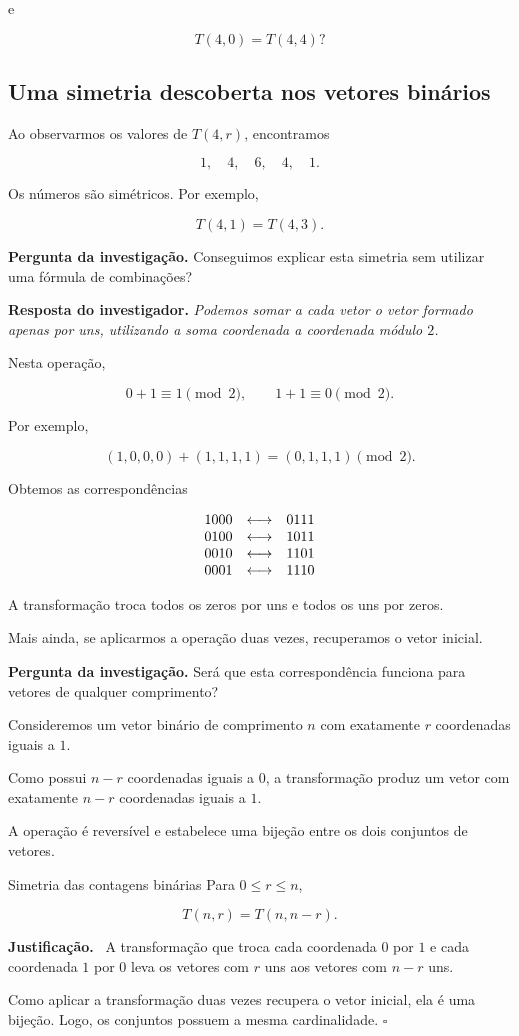 \documentclass[11pt,a4paper,oneside]{book}
\newcommand{\Pergunta}[1]{\begin{perguntabox}\textbf{Pergunta da investigação.} #1\end{perguntabox}}
\newcommand{\Resposta}[1]{\textcolor{verdeescuro}{\textbf{Resposta do investigador.}} \emph{#1}\par}
\newcommand{\prova}{\textbf{Justificação.}\ }
\newcommand{\fimprova}{\hfill$\square$}
\begin{document}
e

\[
T(4,0)=T(4,4)?
\]


\subsection*{Uma simetria descoberta nos vetores binários}

Ao observarmos os valores de $T(4,r)$, encontramos

\[
1,\quad 4,\quad 6,\quad 4,\quad 1.
\]

Os números são simétricos. Por exemplo,

\[
T(4,1)=T(4,3).
\]

\Pergunta{Conseguimos explicar esta simetria
sem utilizar uma fórmula de combinações?}

\Resposta{Podemos somar a cada vetor o vetor
formado apenas por uns, utilizando a soma
coordenada a coordenada módulo $2$.}

Nesta operação,

\[
0+1\equiv1\pmod2,\qquad
1+1\equiv0\pmod2.
\]

Por exemplo,

\[
(1,0,0,0)+(1,1,1,1)
=(0,1,1,1)\pmod2.
\]

Obtemos as correspondências

\[
\begin{array}{c@{\quad\longleftrightarrow\quad}c}
1000 & 0111\\
0100 & 1011\\
0010 & 1101\\
0001 & 1110
\end{array}
\]

A transformação troca todos os zeros por uns
e todos os uns por zeros.

Mais ainda, se aplicarmos a operação duas vezes,
recuperamos o vetor inicial.

\Pergunta{Será que esta correspondência funciona
para vetores de qualquer comprimento?}

Consideremos um vetor binário de comprimento $n$
com exatamente $r$ coordenadas iguais a $1$.

Como possui $n-r$ coordenadas iguais a $0$,
a transformação produz um vetor com exatamente
$n-r$ coordenadas iguais a $1$.

A operação é reversível e estabelece uma bijeção
entre os dois conjuntos de vetores.

\begin{teoremabox}{Simetria das contagens binárias}
Para $0\le r\le n$,

\[
\boxed{T(n,r)=T(n,n-r)}.
\]

\prova
A transformação que troca cada coordenada
$0$ por $1$ e cada coordenada $1$ por $0$
leva os vetores com $r$ uns aos vetores
com $n-r$ uns.

Como aplicar a transformação duas vezes
recupera o vetor inicial, ela é uma bijeção.
Logo, os conjuntos possuem a mesma cardinalidade.
\fimprova
\end{teoremabox}
\end{document}
